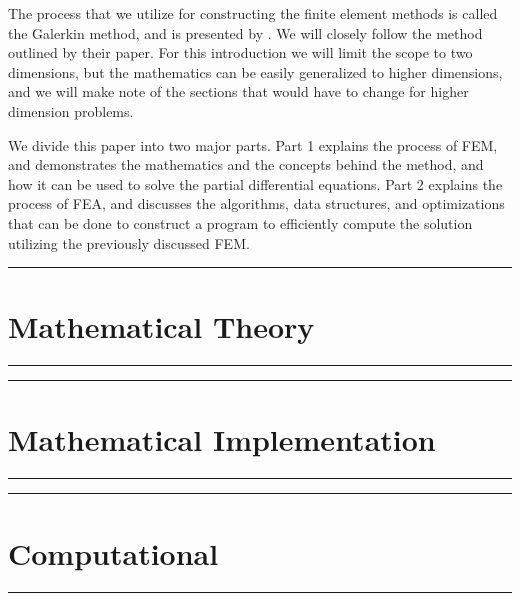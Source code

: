 \documentclass[draft,10pt]{armath}
\numberwithin{equation}{section}
\theoremstyle{definition}
\newcommand{\hdiv}[3]{
  \vspace{#1}%
  \noindent\rule{\textwidth}{#2}%
  \vspace{#3}%
}
\begin{document}
The process that we utilize for constructing the finite element methods is
called the Galerkin method, and is presented by \cite{KH}. We will closely
follow the method outlined by their paper. For this introduction we will limit
the scope to two dimensions, but the mathematics can be easily generalized to
higher dimensions, and we will make note of the sections that would have to
change for higher dimension problems.

We divide this paper into two major parts. Part 1 explains the process of FEM,
and demonstrates the mathematics and the concepts behind the method, and how it
can be used to solve the partial differential equations. Part 2 explains the
process of FEA, and discusses the algorithms, data structures, and
optimizations that can be done to construct a program to efficiently compute
the solution utilizing the previously discussed FEM.

\newpage
\hdiv{10pt}{0.5pt}{1pt}
\part{Mathematical Theory}%
\label{prt:mathematical_theory}
\hdiv{1pt}{0.5pt}{10pt}







% 
% 
% 
% 
% 
% 
% 
% 
% 
% 

\newpage
\hdiv{10pt}{0.5pt}{1pt}
\part{Mathematical Implementation}%
\label{prt:mathematical_implementation}
\hdiv{1pt}{0.5pt}{10pt}








\newpage
\hdiv{10pt}{0.5pt}{1pt}
\part{Computational}%
\label{prt:computational}
\hdiv{10pt}{0.5pt}{1pt}

% 






\newpage
\nocite{*}


\end{document}
